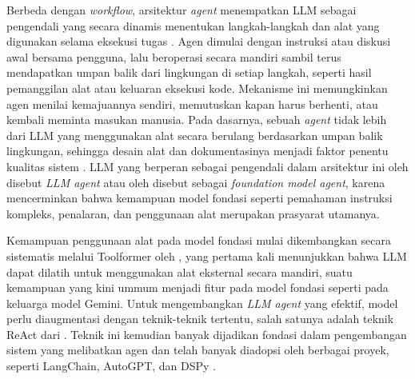 Berbeda dengan \textit{workflow}, arsitektur \textit{agent} menempatkan LLM sebagai pengendali yang secara dinamis menentukan langkah-langkah dan alat yang digunakan selama eksekusi tugas \parencite{anthropicBuildingEffectiveAgents2024}. Agen dimulai dengan instruksi atau diskusi awal bersama pengguna, lalu beroperasi secara mandiri sambil terus mendapatkan umpan balik dari lingkungan di setiap langkah, seperti hasil pemanggilan alat atau keluaran eksekusi kode. Mekanisme ini memungkinkan agen menilai kemajuannya sendiri, memutuskan kapan harus berhenti, atau kembali meminta masukan manusia. Pada dasarnya, sebuah \textit{agent} tidak lebih dari LLM yang menggunakan alat secara berulang berdasarkan umpan balik lingkungan, sehingga desain alat dan dokumentasinya menjadi faktor penentu kualitas sistem \parencite{anthropicBuildingEffectiveAgents2024}. LLM yang berperan sebagai pengendali dalam arsitektur ini oleh \textcite{minaeeLargeLanguageModels2025} disebut \textit{LLM agent} atau oleh \textcite{huyenAIEngineeringBuilding2025} disebut sebagai \textit{foundation model agent}, karena mencerminkan bahwa kemampuan model fondasi seperti pemahaman instruksi kompleks, penalaran, dan penggunaan alat merupakan prasyarat utamanya.

Kemampuan penggunaan alat pada model fondasi mulai dikembangkan secara sistematis melalui Toolformer oleh \textcite{schickToolformerLanguageModels2023}, yang pertama kali menunjukkan bahwa LLM dapat dilatih untuk menggunakan alat eksternal secara mandiri, suatu kemampuan yang kini ummum menjadi fitur pada model fondasi seperti pada keluarga model Gemini. Untuk mengembangkan \textit{LLM agent} yang efektif, model perlu diaugmentasi dengan teknik-teknik tertentu, salah satunya adalah teknik ReAct dari \textcite{yaoReActSynergizingReasoning2023}. Teknik ini kemudian banyak dijadikan fondasi dalam pengembangan sistem yang melibatkan agen dan telah banyak diadopsi oleh berbagai proyek, seperti LangChain, AutoGPT, dan DSPy \parencite{yuSurveyAgentWorkflow2025}.

